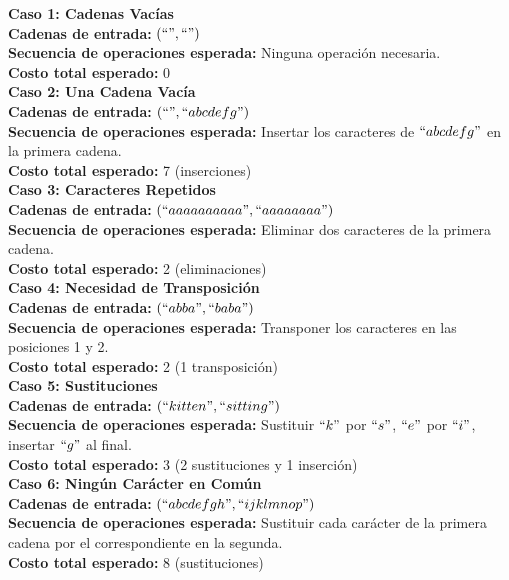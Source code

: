 \noindent \textbf{\large{Caso 1: Cadenas Vacías}}\\
\textbf{Cadenas de entrada:} \texttt{$(``", ``")$} \\
\textbf{Secuencia de operaciones esperada:} Ninguna operación necesaria. \\
\textbf{Costo total esperado:} 0 \\

\noindent \textbf{\large{Caso 2: Una Cadena Vacía}}\\
\textbf{Cadenas de entrada:} \texttt{$(``", ``abcdefg")$} \\
\textbf{Secuencia de operaciones esperada:} Insertar los caracteres de \texttt{$``abcdefg"$} en la primera cadena. \\
\textbf{Costo total esperado:} 7 (inserciones) \\

\noindent \textbf{\large{Caso 3: Caracteres Repetidos}}\\
\textbf{Cadenas de entrada:} \texttt{$(``aaaaaaaaaa", ``aaaaaaaa")$} \\
\textbf{Secuencia de operaciones esperada:} Eliminar dos caracteres de la primera cadena. \\
\textbf{Costo total esperado:} 2 (eliminaciones) \\

\noindent \textbf{\large{Caso 4: Necesidad de Transposición}}\\
\textbf{Cadenas de entrada:} \texttt{$(``abba", ``baba")$} \\
\textbf{Secuencia de operaciones esperada:} Transponer los caracteres en las posiciones 1 y 2. \\
\textbf{Costo total esperado:} 2 (1 transposición) \\

\noindent \textbf{\large{Caso 5: Sustituciones}}\\
\textbf{Cadenas de entrada:} \texttt{$(``kitten", ``sitting")$} \\
\textbf{Secuencia de operaciones esperada:} Sustituir $``k"$ por $``s"$, $``e"$ por $``i"$, insertar $``g"$ al final. \\
\textbf{Costo total esperado:} 3 (2 sustituciones y 1 inserción) \\

\noindent \textbf{\large{Caso 6: Ningún Carácter en Común}}\\
\textbf{Cadenas de entrada:} \texttt{$(``abcdefgh", ``ijklmnop")$} \\
\textbf{Secuencia de operaciones esperada:} Sustituir cada carácter de la primera cadena por el correspondiente en la segunda. \\
\textbf{Costo total esperado:} 8 (sustituciones) \\

